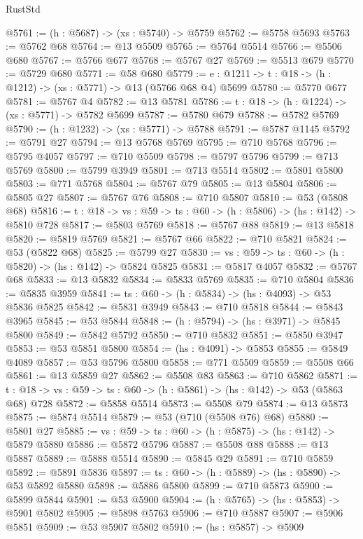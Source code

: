 \begin{lexlean}{RustStd}
\begin{coremodule}
@5761 := (h : @5687) -> (xs : @5740) -> @5759
@5762 := @5758 @5693
@5763 := @5762 @68
@5764 := @13 @5509
@5765 := @5764 @5514
@5766 := @5506 @680
@5767 := @5766 @677
@5768 := @5767 @27
@5769 := @5513 @679
@5770 := @5729 @680
@5771 := @58 @680
@5779 := {e : @1211} -> {t : @18} -> (h : @1212) -> (xs : @5771) -> @13 (@5766 @68 @4) @5699
@5780 := @5770 @677
@5781 := @5767 @4
@5782 := @13 @5781
@5786 := {t : @18} -> (h : @1224) -> (xs : @5771) -> @5782 @5699
@5787 := @5780 @679
@5788 := @5782 @5769
@5790 := (h : @1232) -> (xs : @5771) -> @5788
@5791 := @5787 @1145
@5792 := @5791 @27
@5794 := @13 @5768 @5769
@5795 := @710 @5768
@5796 := @5795 @4057
@5797 := @710 @5509
@5798 := @5797 @5796
@5799 := @713 @5769
@5800 := @5799 @3949
@5801 := @713 @5514
@5802 := @5801 @5800
@5803 := @771 @5768
@5804 := @5767 @79
@5805 := @13 @5804
@5806 := @5805 @27
@5807 := @5767 @76
@5808 := @710 @5807
@5810 := @53 (@5808 @68)
@5816 := {t : @18} -> {vs : @59} -> {ts : @60} -> (h : @5806) -> (hs : @142) -> @5810 @728
@5817 := @5803 @5769
@5818 := @5767 @88
@5819 := @13 @5818
@5820 := @5819 @5769
@5821 := @5767 @66
@5822 := @710 @5821
@5824 := @53 (@5822 @68)
@5825 := @5799 @27
@5830 := {vs : @59} -> {ts : @60} -> (h : @5820) -> (hs : @142) -> @5824 @5825
@5831 := @5817 @4057
@5832 := @5767 @68
@5833 := @13 @5832
@5834 := @5833 @5769
@5835 := @710 @5804
@5836 := @5835 @3959
@5841 := {ts : @60} -> (h : @5834) -> (hs : @4093) -> @53 @5836 @5825
@5842 := @5831 @3949
@5843 := @710 @5818
@5844 := @5843 @3965
@5845 := @53 @5844
@5848 := (h : @5794) -> (hs : @3971) -> @5845 @5800
@5849 := @5842 @5792
@5850 := @710 @5832
@5851 := @5850 @3947
@5853 := @53 @5851 @5800
@5854 := (hs : @4091) -> @5853
@5855 := @5849 @4089
@5857 := @53 @5796 @5800
@5858 := @771 @5509
@5859 := @5508 @66
@5861 := @13 @5859 @27
@5862 := @5508 @83
@5863 := @710 @5862
@5871 := {t : @18} -> {vs : @59} -> {ts : @60} -> (h : @5861) -> (hs : @142) -> @53 (@5863 @68) @728
@5872 := @5858 @5514
@5873 := @5508 @79
@5874 := @13 @5873
@5875 := @5874 @5514
@5879 := @53 (@710 (@5508 @76) @68)
@5880 := @5801 @27
@5885 := {vs : @59} -> {ts : @60} -> (h : @5875) -> (hs : @142) -> @5879 @5880
@5886 := @5872 @5796
@5887 := @5508 @88
@5888 := @13 @5887
@5889 := @5888 @5514
@5890 := @5845 @29
@5891 := @710 @5859
@5892 := @5891 @5836
@5897 := {ts : @60} -> (h : @5889) -> (hs : @5890) -> @53 @5892 @5880
@5898 := @5886 @5800
@5899 := @710 @5873
@5900 := @5899 @5844
@5901 := @53 @5900
@5904 := (h : @5765) -> (hs : @5853) -> @5901 @5802
@5905 := @5898 @5763
@5906 := @710 @5887
@5907 := @5906 @5851
@5909 := @53 @5907 @5802
@5910 := (hs : @5857) -> @5909

\end{coremodule}
\end{lexlean}
